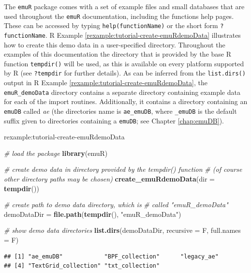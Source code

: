 \documentclass[]{book}
\newenvironment{Shaded}{\begin{snugshade}}{\end{snugshade}}
\newcommand{\CommentTok}[1]{\textcolor[rgb]{0.56,0.35,0.01}{\textit{#1}}}
\newcommand{\DataTypeTok}[1]{\textcolor[rgb]{0.13,0.29,0.53}{#1}}
\newcommand{\KeywordTok}[1]{\textcolor[rgb]{0.13,0.29,0.53}{\textbf{#1}}}
\newcommand{\NormalTok}[1]{#1}
\newcommand{\StringTok}[1]{\textcolor[rgb]{0.31,0.60,0.02}{#1}}
\theoremstyle{definition}
\theoremstyle{definition}
\theoremstyle{definition}
\theoremstyle{remark}
\begin{document}
The \texttt{emuR} package comes with a set of example files and small
databases that are used throughout the \texttt{emuR} documentation,
including the functions help pages. These can be accessed by typing
\texttt{help(functionName)} or the short form \texttt{?functionName}. R
Example \ref{rexample:tutorial-create-emuRdemoData} illustrates how to
create this demo data in a user-specified directory. Throughout the
examples of this documentation the directory that is provided by the
base R function \texttt{tempdir()} will be used, as this is available on
every platform supported by R (see \texttt{?tempdir} for further
details). As can be inferred from the \texttt{list.dirs()} output in R
Example \ref{rexample:tutorial-create-emuRdemoData}, the
\texttt{emuR\_demoData} directory contains a separate directory
containing example data for each of the import routines. Additionally,
it contains a directory containing an \texttt{emuDB} called \emph{ae}
(the directories name is \texttt{ae\_emuDB}, where \texttt{\_emuDB} is
the default suffix given to directories containing a \texttt{emuDB}; see
Chapter \ref{chap:emuDB}).

rexample:tutorial-create-emuRdemoData

\begin{Shaded}
\begin{Highlighting}[]
\CommentTok{# load the package}
\KeywordTok{library}\NormalTok{(emuR)}

\CommentTok{# create demo data in directory provided by the tempdir() function}
\CommentTok{# (of course other directory paths may be chosen)}
\KeywordTok{create_emuRdemoData}\NormalTok{(}\DataTypeTok{dir =} \KeywordTok{tempdir}\NormalTok{())}

\CommentTok{# create path to demo data directory, which is}
\CommentTok{# called "emuR_demoData"}
\NormalTok{demoDataDir =}\StringTok{ }\KeywordTok{file.path}\NormalTok{(}\KeywordTok{tempdir}\NormalTok{(), }\StringTok{"emuR_demoData"}\NormalTok{)}

\CommentTok{# show demo data directories}
\KeywordTok{list.dirs}\NormalTok{(demoDataDir, }\DataTypeTok{recursive =}\NormalTok{ F, }\DataTypeTok{full.names =}\NormalTok{ F)}
\end{Highlighting}
\end{Shaded}

\begin{verbatim}
## [1] "ae_emuDB"            "BPF_collection"      "legacy_ae"          
## [4] "TextGrid_collection" "txt_collection"
\end{verbatim}
\end{document}
